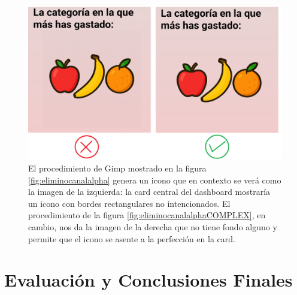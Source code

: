 \documentclass[a4paper,12pt]{report}
\begin{document}
\FloatBarrier
\setlength{\belowcaptionskip}{3pt}
\begin{figure}[H]
	\centering
	\caption{El procedimiento de Gimp mostrado en la figura \ref{fig:eliminocanalalpha} genera un icono que en contexto se verá como la imagen de la izquierda: la card central del dashboard mostraría un icono con bordes rectangulares no intencionados. El procedimiento de la figura \ref{fig:eliminocanalalphaCOMPLEX}, en cambio, nos da la imagen de la derecha que no tiene fondo alguno y permite que el icono se asente a la perfección en la card.}
	\includegraphics[width=1\linewidth]{img/ventatjaProcedComplexVSsimple.png}

	
	\label{fig:ventatjaProcedComplexVSsimple}
\end{figure}
\FloatBarrier
	
		
		
	\chapter{Evaluación y Conclusiones Finales} %
	

	
	
	
	

	
	
	
	
	
	
	
	
	
	
	
	
	
	
	
	
	
	
	
	
	
	
	
	
	
	
\end{document}

